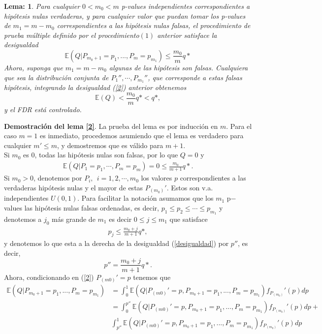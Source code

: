 \documentclass[11pt,letterpaper]{article}
\newcommand{\mE}{\mathbb{E}}
\newtheorem{thml}{Lema:}
\begin{document}
\begin{framed}
    \begin{thml} \label{l_1}
Para cualquier $0 <m_0 <m$ p-values independientes correspondientes a hipótesis nulas verdaderas, y para cualquier valor que puedan tomar los p-values de $m_1= m - m_0$ correspondientes a las hipótesis nulas falsas, el procedimiento de prueba múltiple definido por el procedimiento$(1)$ anterior satisface la desigualdad
\begin{equation}\label{2}
\mE (Q | P_{m_0+1}=p_1, ..., P_m = p_{m_1})\leq \frac{m_0}{m} q *
\end{equation}
Ahora, suponga que $m_1=m-m_0$ algunas de las hipótesis son falsas. Cualquiera que sea la distribución conjunta de $P_1'' ,\cdots, P_{m_1}''$, que corresponde a estas falsas hipótesis, integrando la desigualdad (\ref{2}) anterior obtenemos
\begin{equation*}
\mE(Q) <\frac{m_0}{m}q* <q *,
\end{equation*}
y el FDR está controlado.
    \end{thml}
\end{framed}
\textbf{Demostración del lema \ref{2}}. La prueba del lema es por inducción en $m$. Para el caso $m=1$ es inmediato, procedemos asumiendo que el lema es verdadero para cualquier $m'\leq m$, y demostremos que es válido para $m+1$. \\
Si $m_0$ es 0, todas las hipótesis nulas son falsas, por lo que $Q=0$ y 
\begin{align*}
\mE(Q|P_1=p_1,\cdots, P_m=p_m)=0 \leq \frac{m_0}{m+1}q*.
\end{align*} 
Si $m_0>0$, denotemos por $P_i, \ \ i=1,2,\cdots, m_0$ los valores $p$ correspondientes a las verdaderas hipótesis nulas y el mayor de estas $P_{(m_0)}'$. Estos son v.a. independientes $U(0,1)$. Para facilitar la notación asumamos que los $m_1$ p$-$values las hipótesis nulas falsas ordenadas, es decir, $p_1\leq p_2 \leq \cdots \leq p_{m_1}$ y denotemos a $j_0$ más grande de $m_1$ es decir $0\leq j\leq m_1$ que satisface
\begin{align}\label{desigualdad}
p_j\leq \frac{m_0+j}{m+1}q*,
\end{align}
y denotemos lo que esta a la derecha de la desigualdad (\ref{desigualdad}) por $p''$, es decir, $$p''=\frac{m_0+j}{m+1}q*.$$
Ahora, condicionando en (\ref{2}) $P_{(m0)}'=p$ tenemos que 
\begin{align*}
\mE (Q | P_{m_0+1}=p_1, ..., P_m = p_{m_1})&=\int_0^1 \mE (Q | P_{(m0)}'=p, P_{m_0+1}=p_1, ..., P_m = p_{m_1}) f_{P_{(m_0)}}'(p)dp\\
&=\int_0^{p''} \mE (Q | P_{(m0)}'=p, P_{m_0+1}=p_1, ..., P_m = p_{m_1}) f_{P_{(m_0)}}'(p)dp+\\
&\int_{p''}^1 \mE (Q | P_{(m0)}'=p, P_{m_0+1}=p_1, ..., P_m = p_{m_1}) f_{P_{(m_0)}}'(p)dp
\end{align*} 
\end{document}

